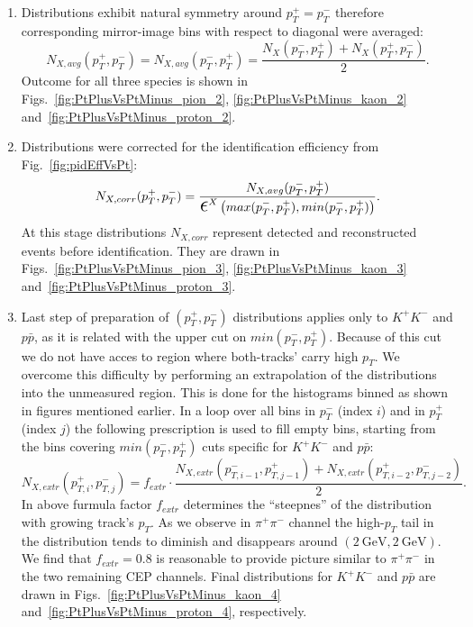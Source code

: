 \begin{enumerate}
 \item Distributions exhibit natural symmetry around $p_{T}^{+}=p_{T}^{-}$ therefore corresponding mirror-image bins with respect to diagonal were averaged:
 \begin{equation}
  N_{X,avg}(p_{T}^{+}, p_{T}^{-}) = N_{X,avg}(p_{T}^{-}, p_{T}^{+}) = \frac{N_{X}(p_{T}^{-}, p_{T}^{+}) + N_{X}(p_{T}^{+}, p_{T}^{-})}{2}.
 \end{equation}
Outcome for all three species is shown in Figs.~\ref{fig:PtPlusVsPtMinus_pion_2}, \ref{fig:PtPlusVsPtMinus_kaon_2} and~\ref{fig:PtPlusVsPtMinus_proton_2}.
 \item Distributions were corrected for the identification efficiency from Fig.~\ref{fig:pidEffVsPt}:
 \begin{equation}
  N_{X,corr}(p_{T}^{+}, p_{T}^{-}) = \frac{N_{X,avg}(p_{T}^{-}, p_{T}^{+})}{ \mbox{\LARGE$\epsilon$}^{X}\left(max(p_{T}^{-}, p_{T}^{+}), min(p_{T}^{-}, p_{T}^{+})\right) }.
 \end{equation}
 At this stage distributions $N_{X,corr}$ represent detected and reconstructed events before identification. They are drawn in Figs.~\ref{fig:PtPlusVsPtMinus_pion_3}, \ref{fig:PtPlusVsPtMinus_kaon_3} and~\ref{fig:PtPlusVsPtMinus_proton_3}.
 \item Last step of preparation of $(p_{T}^{+}, p_{T}^{-})$ distributions applies only to $K^{+}K^{-}$ and $p\bar{p}$, as it is related with the upper cut on $min(p_{T}^{-}, p_{T}^{+})$. Because of this cut we do not have acces to region where both-tracks' carry high $p_{T}$. We overcome this difficulty by performing an extrapolation of the distributions into the unmeasured region. This is done for the histograms binned as shown in figures mentioned earlier. In a loop over all bins in $p_{T}^{-}$ (index $i$) and in $p_{T}^{+}$ (index $j$) the following prescription is used to fill empty bins, starting from the bins covering $min(p_{T}^{-}, p_{T}^{+})$ cuts specific for $K^{+}K^{-}$ and $p\bar{p}$:
 \begin{equation}
  N_{X,extr}(p_{T,i}^{+}, p_{T,j}^{-}) = f_{extr}\cdot\frac{N_{X,extr}(p_{T,i-1}^{-}, p_{T,j-1}^{+}) + N_{X,extr}(p_{T,i-2}^{+}, p_{T,j-2}^{-})}{2}.
 \end{equation}
In above furmula factor $f_{extr}$ determines the ``steepnes'' of the distribution with growing track's $p_{T}$. As we observe in $\pi^{+}\pi^{-}$ channel the high-$p_{T}$ tail in the distribution tends to diminish and disappears around $(2~\text{GeV}, 2~\text{GeV})$. We find that $f_{extr}=0.8$ is reasonable to provide picture similar to $\pi^{+}\pi^{-}$ in the two remaining CEP channels. Final distributions for $K^{+}K^{-}$ and $p\bar{p}$ are drawn in Figs.~\ref{fig:PtPlusVsPtMinus_kaon_4} and~\ref{fig:PtPlusVsPtMinus_proton_4}, respectively.
\end{enumerate}

